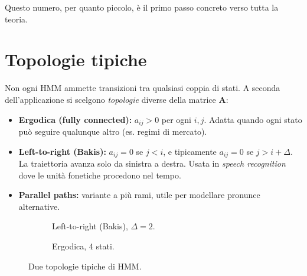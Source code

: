 \documentclass[11pt,a4paper,oneside]{book}
\theoremstyle{plain}
\theoremstyle{definition}
\theoremstyle{remark}
\newcommand{\Amat}{\mathbf{A}}               %
\begin{document}
Questo numero, per quanto piccolo, è il primo passo concreto verso
tutta la teoria.

\section{Topologie tipiche}

Non ogni HMM ammette transizioni tra qualsiasi coppia di stati. A
seconda dell'applicazione si scelgono \emph{topologie} diverse della
matrice $\Amat$:

\begin{itemize}[leftmargin=*]
    \item \textbf{Ergodica (fully connected):} $a_{ij}>0$ per ogni
          $i,j$. Adatta quando ogni stato può seguire qualunque altro
          (es. regimi di mercato).
    \item \textbf{Left-to-right (Bakis):} $a_{ij}=0$ se $j<i$, e
          tipicamente $a_{ij}=0$ se $j>i+\Delta$. La traiettoria
          avanza solo da sinistra a destra. Usata in \emph{speech
          recognition} dove le unità fonetiche procedono nel tempo.
    \item \textbf{Parallel paths:} variante a più rami, utile per
          modellare pronunce alternative.
\end{itemize}

\begin{figure}[h!]
\centering
\begin{subfigure}{0.45\textwidth}
\centering
{}
\caption{Left-to-right (Bakis), $\Delta=2$.}
\end{subfigure}
\hfill
\begin{subfigure}{0.45\textwidth}
\centering
{}
\caption{Ergodica, 4 stati.}
\end{subfigure}
\caption{Due topologie tipiche di HMM.}
\label{fig:topologies}
\end{figure}
\end{document}
